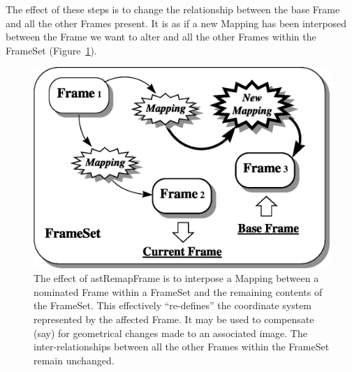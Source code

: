 \documentclass[twoside,11pt]{article}
\newenvironment{latexonly}{}{}
\newcommand{\htmlref}[2]{#1}
\begin{document}
\begin{latexonly}
   The effect of these steps is to change the relationship between the
   base Frame and all the other Frames present. It is as if a new Mapping
   has been interposed between the Frame we want to alter and all the
   other Frames within the FrameSet (Figure~\ref{fig:fsremap}).
   \begin{figure}[hbtp]
   \begin{center}
   \includegraphics[scale=0.6]{sun211_figures/fsremap.eps}
   \caption{The effect of \htmlref{astRemapFrame}{astRemapFrame} is to interpose a Mapping between
   a nominated Frame within a FrameSet and the remaining contents of the
   FrameSet. This effectively ``re-defines'' the coordinate system
   represented by the affected Frame. It may be used to compensate (say)
   for geometrical changes made to an associated image. The
   inter-relationships between all the other Frames within the FrameSet
   remain unchanged.}
   \label{fig:fsremap}
   \end{center}
   \end{figure}
\end{latexonly}
\end{document}
